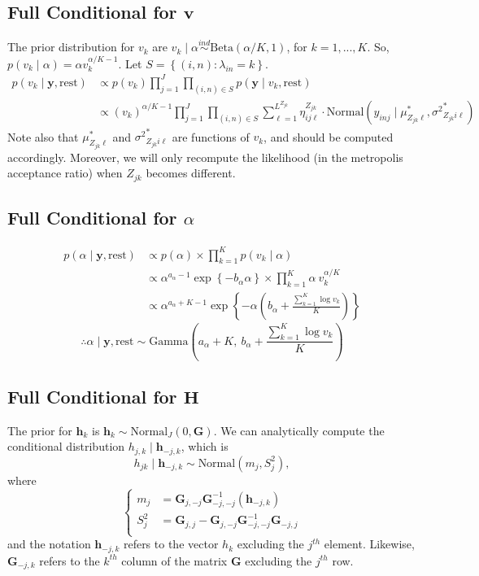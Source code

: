 \documentclass[12pt]{article}
\newcommand{\p}[1]{\left(#1\right)}
\newcommand{\bc}[1]{ \left\{#1\right\} }
\newcommand{\N}{ \mathcal{N} }
\newcommand{\ind}{\overset{ind}{\sim}}
\def\N{\text{Normal}}
\def\G{\text{Gamma}}
\def\Be{\text{Beta}}
\def\lin{\lambda_{in}}
\def\y{\bm{y}}
\def\mus{\mu^*}
\def\sss{{\sigma^2}^*}
\def\rest{\text{rest}}
\def\h{\bm{h}}
\begin{document}
\subsection{\texorpdfstring{Full Conditional for
$\bm v$}{Full Conditional for \textbackslash{}bm v}}\label{full-conditional-for-bm-v}

The prior distribution for $v_k$ are
$v_k \mid \alpha \ind \Be(\alpha/K, 1)$, for $k = 1,...,K$. So,
$p(v_k \mid \alpha) = \alpha v_k^{\alpha/K-1}$.
%
Let $S = \bc{(i,n)\colon \lin = k}$.
%
\begin{align*}
p(v_k \mid \y, \rest) &\propto p(v_k) \prod_{j=1}^J\prod_{(i,n)\in S} p(\y \mid v_k, \rest) \\
&\propto (v_k)^{\alpha/K-1} \prod_{j=1}^J \prod_{(i,n)\in S}
\sum_{\ell=1}^{L^{Z_{jk}}} \eta^{Z_{jk}}_{ij\ell} \cdot
\N(y_{inj} \mid \mus_{Z_{jk}\ell}, \sss_{Z_{jk}i\ell})
\end{align*}
%
%
Note also that $\mus_{Z_{jk}\ell}$ and $\sss_{Z_{jk}i\ell}$ are
functions of $v_k$, and should be computed accordingly. Moreover, we
will only recompute the likelihood (in the metropolis acceptance ratio)
when $Z_{jk}$ becomes different.

\subsection{\texorpdfstring{Full Conditional for
$\alpha$}{Full Conditional for \textbackslash{}alpha}}\label{full-conditional-for-alpha}

\begin{align*}
p(\alpha \mid \y, \rest) &\propto p(\alpha) \times \prod_{k=1}^K p(v_k \mid \alpha) \\
&\propto \alpha^{a_\alpha - 1} \exp\bc{-b_\alpha \alpha} \times \prod_{k=1}^K 
\alpha~v_k^{\alpha/K} \\
&\propto \alpha^{a_\alpha + K -1} \exp\bc{-\alpha\p{b_\alpha + 
\frac{\sum_{k=1}^K \log v_k}{K}}}
\end{align*}
%
$$
\therefore \alpha \mid \y, \rest \sim 
\G\p{a_\alpha + K,~ b_\alpha + \frac{\sum_{k=1}^K \log v_k}{K}}
$$

\subsection{\texorpdfstring{Full Conditional for
$\bm H$}{Full Conditional for \textbackslash{}bm H}}\label{full-conditional-for-bm-h}

The prior for $\h_k$ is $\h_k \sim \N_J(0, \bm G)$. We can
analytically compute the conditional distribution
$h_{j,k} \mid \h_{-j,k}$, which is
%
$$
h_{jk}  \mid \h_{-j,k} \sim \N(m_j, S^2_j),
$$
%
where
%
$$
\begin{cases}
m_j &= \bm G_{j,-j} \bm G_{-j,-j}^{-1}(\h_{-j,k})\\
S_j^2 &= \bm G_{j,j} - \bm G_{j,-j}\bm G_{-j,-j}^{-1}\bm G_{-j,j}\\
\end{cases}
$$
%
and the notation $\h_{-j,k}$ refers to the vector $h_k$ excluding
the $j^{th}$ element. Likewise, $\bm G_{-j,k}$ refers to the
$k^{th}$ column of the matrix $\bm G$ excluding the $j^{th}$ row.
\end{document}
